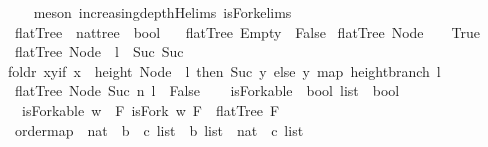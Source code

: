 \begin{isabellebody}
%
\isadelimproof
\ \ %
\endisadelimproof
%
\isatagproof
{}\isamarkupfalse%
\ {\isacharparenleft}meson\ increasing{\isacharunderscore}depth{\isacharunderscore}H{\isachardot}elims{\isacharparenleft}{}{\isacharparenright}\ isFork{\isachardot}elims{\isacharparenleft}{}{\isacharparenright}{\isacharparenright}%
\endisatagproof
{\isafoldproof}%
%
\isadelimproof
\ \ \ \ \isanewline
%
\endisadelimproof
\ \ \ \ \isanewline
\isanewline
{}\isamarkupfalse%
\ flatTree\ {\isacharcolon}{\isacharcolon}\ {\isachardoublequoteopen}nattree\ {\isasymRightarrow}\ bool{\isachardoublequoteclose}\ \isanewline
\ \ {\isachardoublequoteopen}flatTree\ Empty\ {\isacharequal}\ False{\isachardoublequoteclose}\isanewline
{\isacharbar}\ {\isachardoublequoteopen}flatTree\ {\isacharparenleft}Node\ {\isacharunderscore}\ {\isacharbrackleft}{\isacharbrackright}{\isacharparenright}\ {\isacharequal}\ True{\isachardoublequoteclose}\isanewline
{\isacharbar}\ {\isachardoublequoteopen}flatTree\ {\isacharparenleft}Node\ {}\ l{\isacharparenright}\ {\isacharequal}\ {\isacharparenleft}Suc\ {\isacharparenleft}Suc\ {}{\isacharparenright}\ {\isasymle}\ \isanewline
foldr\ {\isacharparenleft}{\isacharparenleft}{\isasymlambda}x{\isachardot}{\isacharparenleft}{\isasymlambda}y{\isachardot}{\isacharparenleft}if\ x\ {\isacharequal}\ {\isacharparenleft}height\ {\isacharparenleft}Node\ {}\ l{\isacharparenright}{\isacharparenright}\ then\ Suc\ y\ else\ y{\isacharparenright}{\isacharparenright}{\isacharparenright}{\isacharparenright}\ {\isacharparenleft}map\ height{\isacharunderscore}branch\ l{\isacharparenright}\ {}{\isacharparenright}{\isachardoublequoteclose}\isanewline
{\isacharbar}\ {\isachardoublequoteopen}flatTree\ {\isacharparenleft}Node\ {\isacharparenleft}Suc\ n{\isacharparenright}\ l{\isacharparenright}\ {\isacharequal}\ False{\isachardoublequoteclose}\isanewline
\ \ \isanewline
{}\isamarkupfalse%
\ isForkable\ {\isacharcolon}{\isacharcolon}\ {\isachardoublequoteopen}bool\ list\ {\isasymRightarrow}\ bool{\isachardoublequoteclose}\ \isanewline
\ \ {\isachardoublequoteopen}isForkable\ w\ {\isacharequal}\ {\isacharparenleft}{\isasymexists}F{\isachardot}\ {\isacharparenleft}isFork\ w\ F{\isacharparenright}\ {\isasymand}\ flatTree\ F{\isacharparenright}{\isachardoublequoteclose}\isanewline
\isanewline
\isanewline
{}\isamarkupfalse%
\ order{\isacharunderscore}map\ {\isacharcolon}{\isacharcolon}\ {\isachardoublequoteopen}{\isacharparenleft}nat\ {\isasymRightarrow}\ {\isacharprime}b\ {\isasymRightarrow}\ {\isacharprime}c\ list{\isacharparenright}\ {\isasymRightarrow}\ {\isacharprime}b\ list\ {\isasymRightarrow}\ nat\ {\isasymRightarrow}\ {\isacharprime}c\ list{\isachardoublequoteclose}\ \isanewline

\end{isabellebody}
